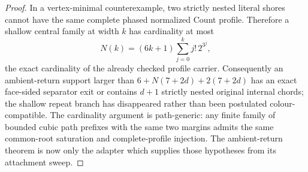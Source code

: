 \begin{proof}
In a vertex-minimal counterexample, two strictly nested literal shores cannot
have the same complete phased normalized Count profile.  Therefore a shallow
central family at width \(k\) has cardinality at most
\[
  N(k)=(6k+1)\sum_{j=0}^{k} j!\,2^{3^j},
\]
the exact cardinality of the already checked profile carrier.
Consequently an ambient-return support larger than
\(6+N(7+2d)+2(7+2d)\) has an exact face-sided separator exit or contains
\(d+1\) strictly nested original internal chords; the shallow repeat branch
has disappeared rather than been postulated colour-compatible.
The cardinality argument is path-generic: any finite family of bounded cubic
path prefixes with the same two margins admits the same common-root
saturation and complete-profile injection.
The ambient-return theorem is now only the adapter which supplies those
hypotheses from its attachment sweep.


\end{proof}
